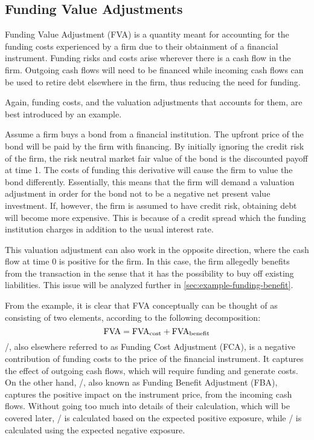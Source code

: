 \documentclass[main.tex]{subfiles}
\begin{document}
    \subsection{Funding Value Adjustments}
        Funding Value Adjustment (FVA) is a quantity meant for accounting for the funding costs 
        experienced by a firm due to their obtainment of a financial instrument.
        Funding risks and costs arise wherever there is a cash flow in the firm. 
        Outgoing cash flows will need to be financed while incoming cash flows
        can be used to retire debt elsewhere in the firm, thus reducing the need for funding.

        Again, funding costs, and the valuation adjustments that accounts for them,
        are best introduced by an example.

        Assume a firm buys a bond from a financial institution.
        The upfront price of the bond will be paid by the firm with financing.
        By initially ignoring the credit risk of the firm, 
        the risk neutral market fair value of the bond is the discounted payoff at time 1.
        The costs of funding this derivative will cause the firm to value the bond differently.
        Essentially, this means that the firm will demand a valuation adjustment 
        in order for the bond not to be a negative net present value investment. 
        If, however, the firm is assumed to have credit risk, obtaining debt will become more expensive. 
        This is because of a credit spread which the funding institution charges in addition to the usual interest rate.
        
        This valuation adjustment can also work in the opposite direction, 
        where the cash flow at time 0 is positive for the firm.
        In this case, the firm allegedly benefits from the transaction 
        in the sense that it has the possibility to buy off existing liabilities.
        This issue will be analyzed further in \cref{sec:example-funding-benefit}.
        
        From the example, it is clear that FVA conceptually can be thought of 
        as consisting of two elements, according to the following decomposition:
        \begin{equation}
            \FVA/ = \FCA/ + \FBA/
        \end{equation}
        \FCA/, also elsewhere referred to as Funding Cost Adjustment (FCA), 
        is a negative contribution of funding costs to the price of the financial instrument.
        It captures the effect of outgoing cash flows, which will require funding and generate costs.
        On the other hand, \FBA/, also known as Funding Benefit Adjustment (FBA), 
        captures the positive impact on the instrument price, from the incoming cash flows.
        Without going too much into details of their calculation, which will be covered later,
        \FCA/ is calculated based on the expected positive exposure, 
        while \FBA/ is calculated using the expected negative exposure. 
\end{document}
